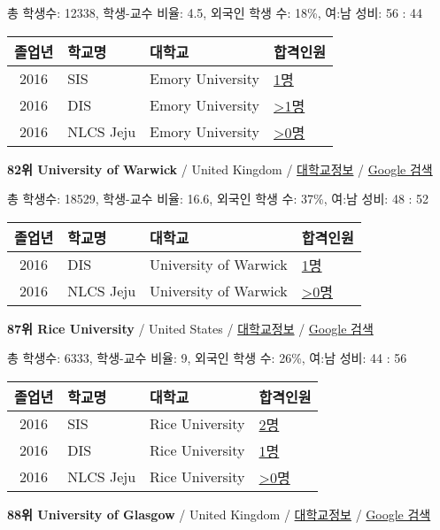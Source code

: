 \documentclass[13pt,]{article}
\begin{document}
총 학생수: 12338, 학생-교수 비율: 4.5, 외국인 학생 수: 18\%, 여:남 성비:
56 : 44

\begin{longtable}[]{@{}clll@{}}
\toprule
졸업년 & 학교명 & 대학교 & 합격인원\tabularnewline
\midrule
\endhead
2016 & SIS & Emory University &
\href{http://cafe.naver.com/assarabia/11589}{1명}\tabularnewline
2016 & DIS & Emory University &
\href{http://cafe.naver.com/assarabia/11591}{\textgreater{}1명}\tabularnewline
2016 & NLCS Jeju & Emory University &
\href{http://cafe.naver.com/assarabia/11592}{\textgreater{}0명}\tabularnewline
\bottomrule
\end{longtable}

\textbf{82위 University of Warwick} / United Kingdom /
\href{https://www.timeshighereducation.com/world-university-rankings/university-of-warwick?ranking-dataset=589595}{대학교정보}
/ \href{http://www.google.com/search?q=University+of+Warwick}{Google
검색}

총 학생수: 18529, 학생-교수 비율: 16.6, 외국인 학생 수: 37\%, 여:남
성비: 48 : 52

\begin{longtable}[]{@{}clll@{}}
\toprule
졸업년 & 학교명 & 대학교 & 합격인원\tabularnewline
\midrule
\endhead
2016 & DIS & University of Warwick &
\href{http://cafe.naver.com/assarabia/11591}{1명}\tabularnewline
2016 & NLCS Jeju & University of Warwick &
\href{http://cafe.naver.com/assarabia/11592}{\textgreater{}0명}\tabularnewline
\bottomrule
\end{longtable}

\textbf{87위 Rice University} / United States /
\href{https://www.timeshighereducation.com/world-university-rankings/rice-university?ranking-dataset=589595}{대학교정보}
/ \href{http://www.google.com/search?q=Rice+University}{Google 검색}

총 학생수: 6333, 학생-교수 비율: 9, 외국인 학생 수: 26\%, 여:남 성비: 44
: 56

\begin{longtable}[]{@{}clll@{}}
\toprule
졸업년 & 학교명 & 대학교 & 합격인원\tabularnewline
\midrule
\endhead
2016 & SIS & Rice University &
\href{http://cafe.naver.com/assarabia/11589}{2명}\tabularnewline
2016 & DIS & Rice University &
\href{http://cafe.naver.com/assarabia/11591}{1명}\tabularnewline
2016 & NLCS Jeju & Rice University &
\href{http://cafe.naver.com/assarabia/11592}{\textgreater{}0명}\tabularnewline
\bottomrule
\end{longtable}

\textbf{88위 University of Glasgow} / United Kingdom /
\href{https://www.timeshighereducation.com/world-university-rankings/university-of-glasgow?ranking-dataset=589595}{대학교정보}
/ \href{http://www.google.com/search?q=University+of+Glasgow}{Google
검색}
\end{document}
